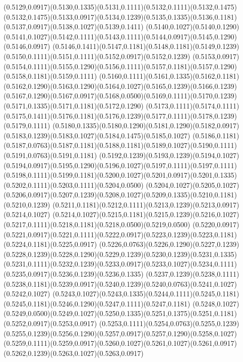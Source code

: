(0.5129,0.0917)(0.5130,0.1335)(0.5131,0.1111)(0.5132,0.1111)(0.5132,0.1475)
\PST@Solid(0.5132,0.1475)(0.5133,0.0917)(0.5134,0.1239)(0.5135,0.1335)(0.5136,0.1181)(0.5137,0.0917)(0.5138,0.1027)(0.5139,0.1411)
(0.5140,0.1027)(0.5140,0.1290)(0.5141,0.1027)(0.5142,0.1111)(0.5143,0.1111)(0.5144,0.0917)(0.5145,0.1290)(0.5146,0.0917)
(0.5146,0.1411)(0.5147,0.1181)(0.5148,0.1181)(0.5149,0.1239)(0.5150,0.1111)(0.5151,0.1111)(0.5152,0.0917)(0.5152,0.1239)
(0.5153,0.0917)(0.5154,0.1111)(0.5155,0.1290)(0.5156,0.1111)(0.5157,0.1181)(0.5157,0.1290)(0.5158,0.1181)(0.5159,0.1111)
(0.5160,0.1111)(0.5161,0.1335)(0.5162,0.1181)(0.5162,0.1290)(0.5163,0.1290)(0.5164,0.1027)(0.5165,0.1239)(0.5166,0.1239)
(0.5167,0.1290)(0.5167,0.0917)(0.5168,0.0500)(0.5169,0.1111)(0.5170,0.1239)(0.5171,0.1335)(0.5171,0.1181)(0.5172,0.1290)
(0.5173,0.1111)(0.5174,0.1111)(0.5175,0.1411)(0.5176,0.1181)(0.5176,0.1239)(0.5177,0.1111)(0.5178,0.1239)(0.5179,0.1111)
(0.5180,0.1335)(0.5180,0.1290)(0.5181,0.1290)(0.5182,0.0917)(0.5183,0.1239)(0.5183,0.1027)(0.5184,0.1475)(0.5185,0.1027)
(0.5186,0.1181)(0.5187,0.0763)(0.5187,0.1181)(0.5188,0.1181)(0.5189,0.1027)(0.5190,0.1111)(0.5191,0.0763)(0.5191,0.1181)
(0.5192,0.1239)(0.5193,0.1239)(0.5194,0.1027)(0.5194,0.0917)(0.5195,0.1290)(0.5196,0.1027)(0.5197,0.1111)(0.5197,0.1111)
(0.5198,0.1111)(0.5199,0.1181)(0.5200,0.1027)(0.5201,0.0917)(0.5201,0.1335)(0.5202,0.1111)(0.5203,0.1111)(0.5204,0.0500)
(0.5204,0.1027)(0.5205,0.1027)(0.5206,0.0917)(0.5207,0.1239)(0.5208,0.1027)(0.5209,0.1335)(0.5210,0.1181)(0.5210,0.1239)
(0.5211,0.1181)(0.5212,0.1111)(0.5213,0.1239)(0.5213,0.0917)(0.5214,0.1027)
\PST@Solid(0.5214,0.1027)(0.5215,0.1181)(0.5215,0.1239)(0.5216,0.1027)(0.5217,0.1111)(0.5218,0.1181)(0.5218,0.0500)(0.5219,0.0500)
(0.5220,0.0917)(0.5221,0.0917)(0.5221,0.1111)(0.5222,0.0917)(0.5223,0.1239)(0.5223,0.1181)(0.5224,0.1181)(0.5225,0.0917)
(0.5226,0.0763)(0.5226,0.1290)(0.5227,0.1239)(0.5228,0.1239)(0.5228,0.1290)(0.5229,0.1239)(0.5230,0.1239)(0.5231,0.1335)
(0.5231,0.1111)(0.5232,0.1239)(0.5233,0.0917)(0.5233,0.1027)(0.5234,0.1111)(0.5235,0.0917)(0.5236,0.1239)(0.5236,0.1335)
(0.5237,0.1239)(0.5238,0.1111)(0.5238,0.1181)(0.5239,0.0917)(0.5240,0.1239)(0.5240,0.0763)(0.5241,0.1027)(0.5242,0.1027)
(0.5243,0.1027)(0.5243,0.1335)(0.5244,0.1111)(0.5245,0.1181)(0.5245,0.1181)(0.5246,0.1290)(0.5247,0.1111)(0.5247,0.1181)
(0.5248,0.1027)(0.5249,0.0500)(0.5249,0.1027)(0.5250,0.1335)(0.5251,0.1375)(0.5251,0.1181)(0.5252,0.0917)(0.5253,0.0917)
(0.5253,0.1111)(0.5254,0.0763)(0.5255,0.1239)(0.5255,0.1239)(0.5256,0.1290)(0.5257,0.0917)(0.5257,0.1290)(0.5258,0.1027)
(0.5259,0.1111)(0.5259,0.0917)(0.5260,0.1027)(0.5261,0.1027)(0.5261,0.0917)(0.5262,0.1239)(0.5263,0.1027)(0.5263,0.0917)
